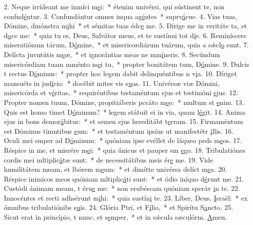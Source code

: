 2. Neque irrídeant me inmíci m\uline{e}i:~* étenim univérsi, qui sústinent te, non confnd\uline{é}ntur.
3. Confundántur omnes inqua ag\uline{é}ntes~* suprv\uline{á}cue.
4. Vias tuas, Dómine, dmónstra m\uline{i}hi~* et sémitas tuas édc\uline{e} me.
5. Dírige me in veritáte ta, et d\uline{o}ce me:~* quia tu es, Deus, Salvátor meus, et te sustínui tot d\uline{i}e.
6. Reminíscere miseratiónum tárum, D\uline{ó}mine,~* et misericordiárum tuárum, quia a sǽcl\uline{o} sunt.
7. Delícta juvntútis m\uline{e}æ,~* et ignorántias meas ne mm\uline{í}neris.
8. Secúndum misericórdiam tuam mménto m\uline{e}i tu,~* propter bonitátem tum, D\uline{ó}mine.
9. Dulcis t rectus D\uline{ó}minus:~* propter hoc legem dabit delinquéntibus n v\uline{i}a.
10. Díriget mansuéts in jud\uline{í}cio:~* docébit mites vis s\uline{u}as.
11. Univérsæ viæ Dómini, misericórda et v\uline{é}ritas,~* requiréntibus testaméntum ejus et testimóni \uline{e}jus.
12. Propter nomen tuum, Dómine, propitiáberis pccáto m\uline{e}o:~* multum st \uline{e}nim.
13. Quis est homo  timet D\uline{ó}minum?~* legem státuit ei in via, quam l\uline{é}git.
14. Anima ejus in bons demor\uline{á}bitur:~* et semen ejus hereditábt t\uline{e}rram.
15. Firmaméntum est Dóminus timntibus \uline{e}um:~* et testaméntum ipsíus ut manifestétr \uline{i}llis.
16. Oculi mei smper ad D\uline{ó}minum:~* quóniam ipse evéllet de láqueo peds m\uline{e}os.
17. Réspice in me, et misrére m\uline{e}i:~* quia únicus et pauper sm \uline{e}go.
18. Tribulatiónes cordis mei mltiplic\uline{á}tæ sunt:~* de necessitátibus meis ér\uline{e} me.
19. Vide humilitátem meam, et lbórem m\uline{e}um:~* et dimítte univérsa delíct m\uline{e}a.
20. Réspice inimícos meos quóniam mltiplic\uline{á}ti sunt:~* et ódio iníquo d\uline{é}runt me.
21. Custódi ánimam meam, t éru\uline{e} me:~* non erubéscam quóniam speráv \uline{i}n te.
22. Innocéntes et recti adhsérunt m\uline{i}hi:~* quia sustín\uline{i} te.
23. Líber, Deus, \uline{I}sraël:~* ex ómnibus tribulatiónibs s\uline{u}is.
24. Glória Ptri, et F\uline{í}lio,~* et Spirítu S\uline{a}ncto.
25. Sicut erat in princípio, t nunc, et s\uline{e}mper,~* et in sǽcula sæculórm. \uline{A}men.
